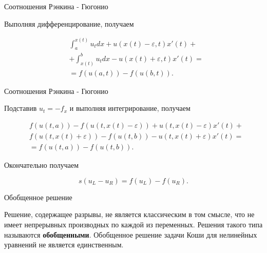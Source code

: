 \documentclass[10pt,xcolor=pst,aspectratio=169]{beamer}
\begin{document}
\begin{frame}{Соотношения Рэнкина - Гюгонио}

    \transdissolve[duration=0.1]
    \justifying
    \large

    Выполняя дифференцирование, получаем

    \[
        \begin{split}
            &\int_{a}^{x(t)} u_{t} dx + u(x(t) - \varepsilon,t) x'(t) + \\
            &+ \int_{x(t)}^{b} u_{t} dx - u(x(t) + \varepsilon,t) x'(t)= \\
            &= f(u(a, t)) - f(u(b, t)).
        \end{split}
    \]

\end{frame}

\begin{frame}{Соотношения Рэнкина - Гюгонио}

    \transdissolve[duration=0.1]
    \justifying
    \large

    Подставив $u_{t} = - f_{x}$ и выполняя интегрирование, получаем

    \[
        \begin{split}
            &f(u(t, a)) - f(u(t, x(t) - \varepsilon)) + u(t, x(t) - \varepsilon) x'(t) + \\
            &f(u(t, x(t) + \varepsilon)) - f(u(t, b)) - u(t, x(t) + \varepsilon ) x'(t) = \\
            &= f(u(t, a)) - f(u(t, b)).
        \end{split}
    \]

    Окончательно получаем

    \[
        s(u_{L} - u_{R}) = f(u_{L}) - f(u_{R}).
    \]

\end{frame}

\begin{frame}{Обобщенное решение}

    \transdissolve[duration=0.1]
    \justifying
    \large

    Решение, содержащее разрывы, не является классическим в том смысле, что не имеет непрерывных производных по каждой из переменных. Решения такого типа называются \textbf{обобщенными}. Обобщенное решение задачи Коши для нелинейных уравнений не является единственным.

\end{frame}
\end{document}
